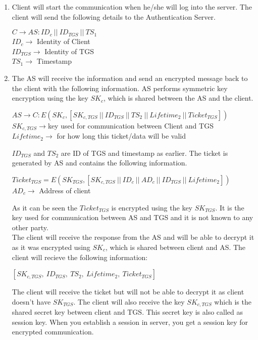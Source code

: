 \documentclass[11pt]{article}
\begin{document}
\begin{enumerate}
    \item Client will start the communication when he/she will log into the server. The client will send the following details to the Authentication Server.
    \begin{center}
        $C \rightarrow AS: {ID}_c \ || \ {ID}_{TGS} \ || \ {TS}_1$\\
        \vspace{1mm}
        ${ID}_c \rightarrow$ Identity of Client\\
        ${ID}_{TGS} \rightarrow$ Identity of TGS\\
        ${TS}_1 \rightarrow$ Timestamp
    \end{center}

    \item The AS will receive the information and send an encrypted message back to the client with the following information. AS performs symmetric key encryption using the key ${SK}_c$, which is shared between the AS and the client.
    \begin{center}
        $AS \rightarrow C: E({SK}_c, [{SK}_{c,TGS} \ || \ {ID}_{TGS} \ || \ {TS}_2 \ || \ {Lifetime}_2 \ || \ {Ticket}_{TGS}])$\\
        \vspace{1mm}
        ${SK}_{c,TGS} \rightarrow $key used for communication between Client and TGS\\
        ${Lifetime}_2 \rightarrow$ for how long this ticket/data will be valid\\      
    \end{center}
    $ID_{TGS}$ and $TS_2$ are ID of TGS and timestamp as earlier. The ticket is generated by AS and contains the following information.
    \begin{center}
        ${Ticket}_{TGS} = E({SK}_{TGS}, [{SK}_{c,TGS} \ || \ {ID}_c \ || \ {AD}_c \ || \ {ID}_{TGS} \ || \ {Lifetime}_2])$\\
        \vspace{1mm}
        ${AD}_c \rightarrow $ Address of client
    \end{center}
    As it can be seen the ${Ticket}_{TGS}$ is encrypted using the key ${SK}_{TGS}$. It is the key used for communication between AS and TGS and it is not known to any other party.\\
    The client will receive the response from the AS and will be able to decrypt it as it was encrypted using ${SK}_c$, which is shared between client and AS. The client will recieve the following information:
    \begin{center}
        $[{SK}_{c,TGS}, \ {ID}_{TGS}, \ {TS}_2, \ {Lifetime}_2, \ {Ticket}_{TGS}]$
    \end{center}
    The client will receive the ticket but will not be able to decrypt it as client doesn't have ${SK}_{TGS}$. The client will also receive the key ${SK}_{c,TGS}$ which is the shared secret key between client and TGS. This secret key is also called as session key. When you establish a session in server, you get a session key for encrypted communication.


\end{enumerate}
\end{document}

